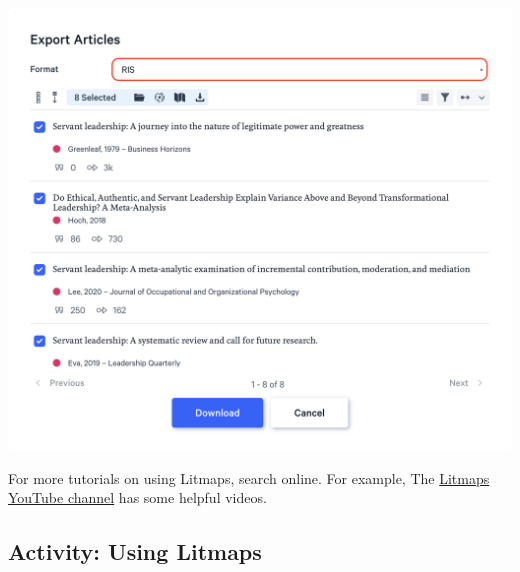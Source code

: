 \documentclass[
]{book}
\theoremstyle{definition}
\theoremstyle{definition}
\theoremstyle{definition}
\theoremstyle{definition}
\theoremstyle{remark}
\begin{document}
\includegraphics{assets/u2/litmaps14.png}

For more tutorials on using Litmaps, search online. For example, The \href{https://www.youtube.com/@litmaps}{Litmaps YouTube channel} has some helpful videos.

\hypertarget{activity-using-litmaps}{%
\subsection*{Activity: Using Litmaps}\label{activity-using-litmaps}}
\end{document}

